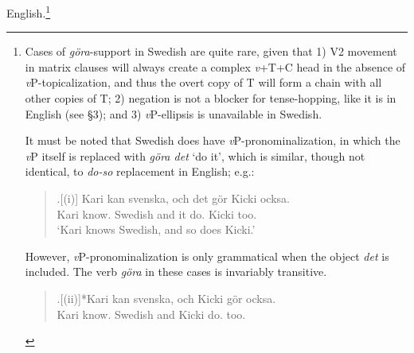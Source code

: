 English.\footnote{\label{gora_support}Cases of \textit{g\"{o}ra}-support in Swedish are quite rare, given that 1) V2 movement in matrix clauses will always create a complex \textit{v}+T+C head in the absence of \textit{v}P-topicalization, and thus the overt copy of T will form a chain with all other copies of T; 2) negation is not a blocker for tense-hopping, like it is in English (see \S3); and 3) \textit{v}P-ellipsis is unavailable in Swedish.

It must be noted that Swedish does have \textit{v}P-pronominalization, in which the \textit{v}P itself is replaced with \textit{g\"{o}ra det} `do it', which is similar, though not identical, to \textit{do-so} replacement in English; e.g.:

\begin{quote}
\ag.[(i)] Kari kan svenska, och det g\"{o}r Kicki ocksa.\\
Kari know. Swedish and it do. Kicki too.\\
`Kari knows Swedish, and so does Kicki.'

\end{quote}
However, \textit{v}P-pronominalization is only grammatical when the object \textit{det} is included. The verb \textit{g\"{o}ra} in these cases is invariably transitive.

\begin{quote}
\ag.[(ii)]*Kari kan svenska, och 	Kicki g\"{o}r ocksa.\\
Kari know. Swedish and Kicki do. too.\\


\end{quote}}
